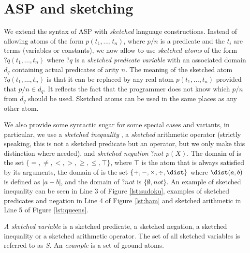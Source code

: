 
\section{ASP and sketching }\label{sec:formal}
We extend the syntax of ASP with \textit{sketched} language constructions. 
Instead of allowing atoms of the form $p(t_1, ...,t_n)$, where $p/n$ is a predicate
and the $t_i$ are terms (variables or constants), we now allow to use
{\em sketched atoms} of the form $?q(t_1, ...,t_n)$ where $?q$ is a {\em sketched predicate variable}
with an associated domain $d_q$ containing actual predicates of arity $n$. 
The meaning of the sketched atom $?q(t_1, ... ,t_n)$ is that it can be replaced
by any real atom $p(t_1, ...,t_n)$ provided that $p/n \in d_q$.
It reflects the fact that the programmer does not know which $p/n$ from $ d_q$ should be used. 
Sketched atoms can be used in the same places as any other atom. 

We also provide some syntactic sugar for some special cases and variants,
in particular, we use a {\em sketched inequality} \sketchedeq, a  {\em sketched} arithmetic operator \sketchedplus (strictly speaking, this is not a sketched predicate but an operator, but we only make this distinction where needed), and {\em sketched negation} ${?}\textit{not } p(X)$.  The domain of \sketchedeq is the set $\{=,\neq,<,>,\geq,\leq,\top\}$, where $\top$ is the atom that is always satisfied by its arguments, the domain of \sketchedplus is the set $\{ +, -, \times, \div, \dist \}$ where $\dist(a,b)$ is defined as $| a - b |$, and the domain of ${?}\textit{not}$  is $\{\emptyset, not\}$. An example of sketched inequality can be seen in Line 3 of Figure \ref{lst:sudoku}, examples of sketched predicates and negation in Line 4 of Figure \ref{lst:ham} and sketched arithmetic in Line 5 of Figure \ref{lst:queens}.


\textit{A sketched variable} is a sketched predicate, a sketched negation, a sketched inequality or a sketched arithmetic operator. The set of all sketched variables is referred to  as $S$. 
An \textit{example} is a set of ground atoms. 

